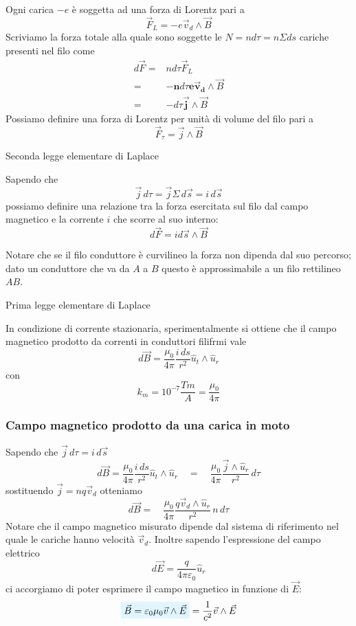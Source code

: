 \documentclass[x11names]{report}
\newcommand{\teorema}[2]{
	\begin{center}
		\fboxsep11pt
		\colorbox{myred}{\begin{minipage}{5.75in}
				\begin{redes}{#1}
					#2
				\end{redes}
		\end{minipage}}
	\end{center}
}
\newcommand{\viola}[1]{%
	\colorbox{myblue}{$\displaystyle #1$}
}
\begin{document}
Ogni carica \(-e\) è soggetta ad una forza di Lorentz pari a 
\[
\vec{F}_L = -e\vec{v}_d \wedge \vec{B}
\] 
Scriviamo la forza totale alla quale sono soggette le \(N = nd\tau = n\Sigma ds\) cariche presenti nel filo come
\begin{align*}
	d\vec{F} =& n d\tau \vec{F}_L  \\
			 =& -\boldsymbol{n} d\tau \boldsymbol{e\vec{v}_d} \wedge \vec{B}  \\
			 =&  -d\tau \boldsymbol{\vec{j}}\wedge \vec{B}
\end{align*}
Possiamo definire una forza di Lorentz per unità di volume del filo pari a 
\[
\vec{F}_\tau = \vec{j}\wedge \vec{B}
\]
\teorema{Seconda legge elementare di Laplace}{
Sapendo che 
\[
\vec{j} \, d\tau = \vec{j}\Sigma \, d\vec{s} = i \, d\vec{s}
\]
possiamo definire una relazione tra la forza esercitata sul filo dal campo magnetico e la corrente \(i\) che scorre al suo interno:
\begin{equation}
	d\vec{F} = id\vec{s}\wedge \vec{B}
\end{equation}
}
Notare che se il filo conduttore è curvilineo la forza non dipenda dal suo percorso; dato un conduttore che va da \(A\) a \(B\) questo è approssimabile a un filo rettilineo \(AB\).

\teorema{Prima legge elementare di Laplace}{
	In condizione di corrente stazionaria, sperimentalmente si ottiene che il campo magnetico prodotto da correnti in conduttori filifrmi vale
	\begin{equation}
		d\vec{B} = \frac{\mu_0}{4\pi} \frac{i \, ds}{r^2}\hat{u}_t \wedge \hat{u}_r
	\end{equation}
	con 
	\[
	k_m = 10^{-7} \frac{Tm}{A} = \frac{\mu_0}{4\pi}
	\]
}

\subsubsection{Campo magnetico prodotto da una carica in moto}
Sapendo che \(\vec{j} \, d\tau = i \, d\vec{s}\)
\[
d\vec{B} = \frac{\mu_0}{4\pi} \frac{i \, ds}{r^2}\hat{u}_t \wedge \hat{u}_r \quad  = \quad \frac{\mu_0}{4\pi} \frac{\vec{j} \wedge \hat{u}_r}{r^2} \, d\tau 
\]
sostituendo \(\vec{j} = n q \vec{v}_d\) otteniamo
\[
d\vec{B} = \quad \frac{\mu_0}{4\pi} \frac{q\vec{v}_d \wedge \hat{u}_r}{r^2} \, n \, d\tau 
\]
Notare che il campo magnetico misurato dipende dal sistema di riferimento nel quale le cariche hanno velocità \(\vec{v}_d\). Inoltre sapendo l'espressione del campo elettrico
\[
d\vec{E} = \frac{q}{4\pi \varepsilon_0}\hat{u}_r
\]
ci accorgiamo di poter esprimere il campo magnetico in funzione di \(\vec{E}\):
\begin{equation}
	\viola{\vec{B} = \varepsilon_0 \mu_0 \vec{v}\wedge\vec{E}} = \frac{1}{c^2} \vec{v}\wedge\vec{E}
\end{equation}
\end{document}
